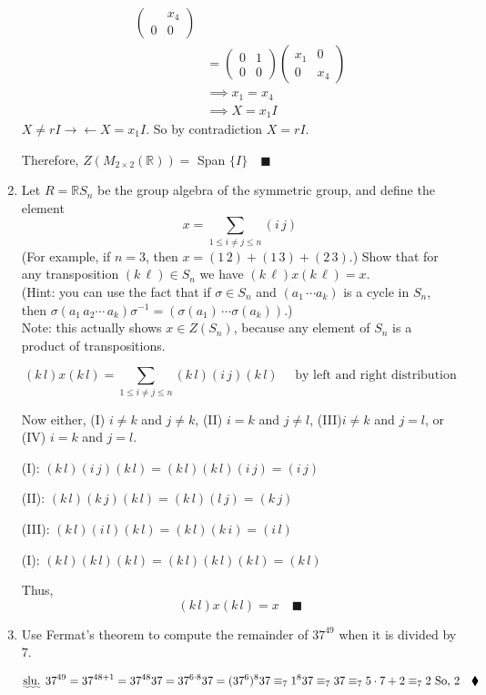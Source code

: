 \documentclass{article}
\newcommand\R{\mathbb{R}}
\begin{document}
\begin{enumerate}
\begin{align*}
\begin{pmatrix}
    &x_4\\0&0\end{pmatrix}\\ &= \begin{pmatrix}
    0&1\\0&0\end{pmatrix} \begin{pmatrix} x_1 & 0\\0 &
      x_4 \end{pmatrix}\\&\implies
    x_1=x_4\\ &\implies X = x_1I \end{align*}
  $X\neq rI \rightarrow\leftarrow X = x_1I$. So by contradiction $X =
  rI$.

  Therefore, $Z(M_{2\times 2}(\R))=$ Span $\{I\}\quad \blacksquare$
\item Let $R = \R S_n$ be the group algebra of the symmetric group, and define the element
\[
x = \sum_{1 \leq i \not= j \leq n} (i\,j)
\]
(For example, if $n=3$, then $x = (1\,2) + (1\,3) + (2\,3)$.) Show that for any transposition $(k\,\ell) \in S_n$ we have $(k\,\ell) x (k\,\ell) = x$.\\
(Hint: you can use the fact that if $\sigma \in S_n$ and $(a_1 \, \cdots a_k)$ is a cycle in $S_n$, then  $\sigma (a_1 \,a_2 \cdots \, a_k)\sigma^{-1} = (\sigma(a_1) \, \cdots \sigma(a_k))$.)\\
Note: this actually shows $x \in Z(S_n)$, because any element of $S_n$ is a product of transpositions.


\[
(k\,l)x(k\,l)= \sum_{1 \leq i \not= j \leq n} (k\,l)(i\,j)(k\,l)
\quad\text{ by
  left and right distribution}
\]

Now either, (I) $i\neq k$ and $j\neq k$, (II)  $i = k$ and $j\neq l$, (III)$i \neq k$
and $j= l$, or (IV) $i=k$ and $j=l$.

(I): $(k\, l)(i\,j)(k\, l) = (k\, l)(k\, l)(i\, j) = (i\, j)$

(II): $(k\, l)(k\,j)(k\, l) = (k\, l)(l\, j) = (k\, j)$

(III): $(k\, l)(i\,l)(k\, l) = (k\, l)(k\, i) = (i\, l)$

(I): $(k\, l)(k\,l)(k\, l) = (k\, l)(k\, l)(k\, l) = (k\, l)$

Thus, \[(k\,l)x(k\,l) = x\quad \blacksquare\]
\item Use Fermat's theorem to compute the remainder of $37^{49}$ when it is divided by $7$.

  \[\text{\uwave{slu.} }37^{49} = 37^{48+1} = 37^{48}37 = 37^{6\cdot 8}37= (37^6)^8 37
    \equiv_7 1^8 37 \equiv_7 37 \equiv_7 5\cdot 7 +2 \equiv_7 2\text{
      So, 2}\quad \blacklozenge\]



\end{enumerate}
\end{document}
